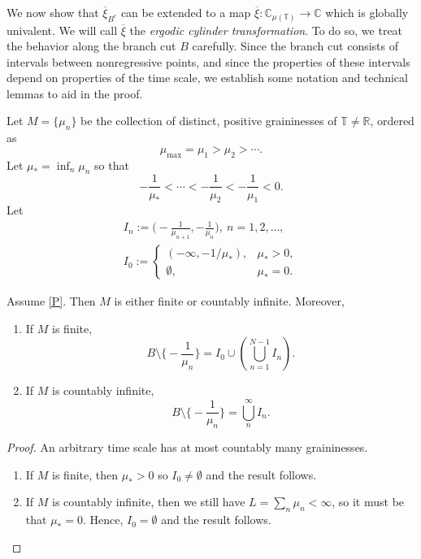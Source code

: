 \documentclass[reqno]{amsart}
\begin{document}
We now show that $\overline{\xi}_{B^c}$ can be extended to a map $\overline{\xi}:\mathbb{C}_{\mu(\mathbb{T})} \to \mathbb{C}$
which is globally univalent. We will call $\overline{\xi}$ the \emph{ergodic cylinder
transformation}. To do so, we treat the behavior along the branch cut $B$ carefully.
Since the branch cut consists of intervals between nonregressive points, and since
the properties of these intervals depend on properties of the time scale, we establish
some notation and technical lemmas to aid in the proof.

Let $M=\{\mu_n\}$ be the collection of distinct, positive graininesses of $\mathbb{T}\not=\mathbb{R}$,
ordered as
$$
\mu_{\max}=\mu_1>\mu_2>\cdots.
$$
Let $\mu_*=\inf_{n} \mu_n$ so that
$$
 -\frac{1}{\mu_*}<\cdots < -\frac{1}{\mu_2} < -\frac{1}{\mu_1}<0.
$$
Let
 \begin{gather*}
 I_n:=\Big(-\frac{1}{\mu_{n+1}},-\frac{1}{\mu_n}\Big),\ n=1,2,\dots,\\
 I_0:=
 \begin{cases}
 (-\infty,-1/\mu_*), & \mu_*>0,\\
 \emptyset, & \mu_*=0.
 \end{cases}
 \end{gather*}

\begin{lemma}
\label{lem:B_structure}
Assume \eqref{P}. Then $M$ is either finite or countably infinite. Moreover,
\begin{enumerate}
 \item If $M$ is finite,
 $$
 B\setminus \Big\{-\frac{1}{\mu_n}\Big\} = I_0 \cup \left(\bigcup_{n=1}^{N-1} I_n\right).
 $$

 \item If $M$ is countably infinite,
 $$
 B\setminus \Big\{-\frac{1}{\mu_n}\Big\} = \bigcup_n^\infty I_n.
 $$
\end{enumerate}
\end{lemma}

\begin{proof}
An arbitrary time scale has at most countably many graininesses.
 \begin{enumerate}
 \item If $M$ is finite, then $\mu_*>0$ so $I_0\not=\emptyset$ and the result follows.
 \item If $M$ is countably infinite, then we still have $ L=\sum_n \mu_n<\infty$,
 so it must be that $\mu_*=0$. Hence, $I_0=\emptyset$ and the result follows.
 \end{enumerate}
\end{proof}
\end{document}

